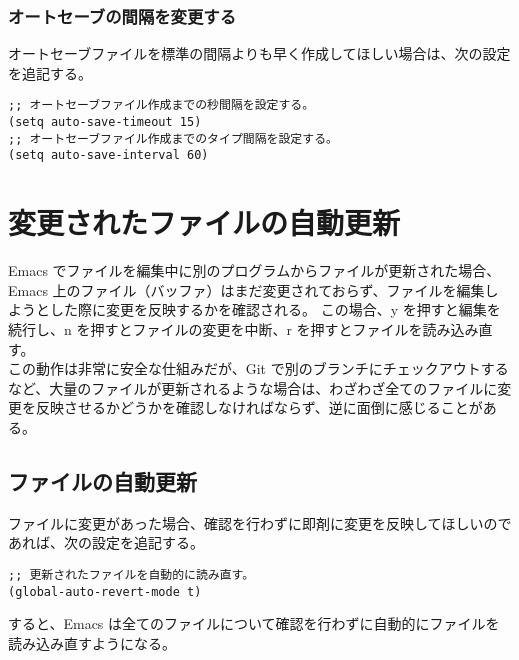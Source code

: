 \subsubsection{オートセーブの間隔を変更する}
オートセーブファイルを標準の間隔よりも早く作成してほしい場合は、次の設定を追記する。\enlargethispage{0.50zw}
\begin{mdframed}[roundcorner=0.50zw,leftmargin=3.00zw,rightmargin=3.00zw,skipabove=0.40zw,skipbelow=0.40zw,innertopmargin=4.00pt,innerbottommargin=4.00pt,innerleftmargin=5.00pt,innerrightmargin=5.00pt,linecolor=gray!020,linewidth=0.50pt,backgroundcolor=gray!20]
\begin{verbatim}
;; オートセーブファイル作成までの秒間隔を設定する。
(setq auto-save-timeout 15)
;; オートセーブファイル作成までのタイプ間隔を設定する。
(setq auto-save-interval 60)
\end{verbatim}
\end{mdframed}
\section{変更されたファイルの自動更新}
Emacs でファイルを編集中に別のプログラムからファイルが更新された場合、Emacs 上のファイル（バッファ）はまだ変更されておらず、ファイルを編集しようとした際に変更を反映するかを確認される。
この場合、y を押すと編集を続行し、n を押すとファイルの変更を中断、r を押すとファイルを読み込み直す。\\

この動作は非常に安全な仕組みだが、Git で別のブランチにチェックアウトするなど、大量のファイルが更新されるような場合は、わざわざ全てのファイルに変更を反映させるかどうかを確認しなければならず、逆に面倒に感じることがある。
\subsection{ファイルの自動更新}
ファイルに変更があった場合、確認を行わずに即剤に変更を反映してほしいのであれば、次の設定を追記する。
\begin{mdframed}[roundcorner=0.50zw,leftmargin=3.00zw,rightmargin=3.00zw,skipabove=0.40zw,skipbelow=0.40zw,innertopmargin=4.00pt,innerbottommargin=4.00pt,innerleftmargin=5.00pt,innerrightmargin=5.00pt,linecolor=gray!020,linewidth=0.50pt,backgroundcolor=gray!20]
\begin{verbatim}
;; 更新されたファイルを自動的に読み直す。
(global-auto-revert-mode t)
\end{verbatim}
\end{mdframed}
すると、Emacs は全てのファイルについて確認を行わずに自動的にファイルを読み込み直すようになる。
